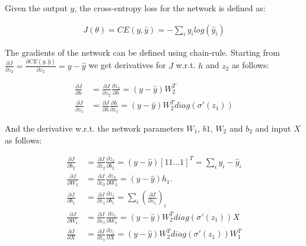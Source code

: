 \documentclass{article}
\begin{document}
Given the output $\hat{y}$, the cross-entropy loss for the network is defined as:

\begin{equation*}
  \label{eq:CE-loss}
  \begin{split}
    J(\theta) = CE(y, \hat{y}) = - \sum_{i} y_{i} log(\hat{y}_{i})
  \end{split}
\end{equation*}

The gradients of the network can be defined using chain-rule. Starting from $\frac{\partial J}{\partial z_{2}} = \frac{\partial CE(y, \hat{y})}{\partial z_{2}} = y - \hat{y}$ we get derivatives for $J$ w.r.t. $h$ and $z_{2}$ as follows:

\begin{equation*}
  \label{eq:temp-grads}
  \begin{split}
    \frac{\partial J}{\partial h} &= \frac{\partial J}{\partial z_{2}}\frac{\partial z_{2}}{\partial h} = (y - \hat{y}) W_{2}^{T}
    \\
    \frac{\partial J}{\partial z_{1}} &= \frac{\partial J}{\partial h}\frac{\partial h}{\partial z_{1}} = (y - \hat{y}) W_{2}^{T} diag(\sigma'(z_{1}))
  \end{split}
\end{equation*}

And the derivative w.r.t. the network parameters $W_{1}$, $b{1}$, $W_{2}$ and $b_{2}$ and input $X$ as follows:

\begin{equation*}
  \label{eq:param-grads}
  \begin{split}
    \frac{\partial J}{\partial b_{2}} &= \frac{\partial J}{\partial z_{2}}\frac{\partial z_{2}}{\partial b_{2}} = (y - \hat{y}) [1 1 \hdots 1]^{T} = \sum_{i}{y_{i} - \hat{y}_{i}}
    \\
    \frac{\partial J}{\partial W_{2}} &= \frac{\partial J}{\partial z_{2}}\frac{\partial z_{2}}{\partial W_{2}} = (y - \hat{y}) h_{1}.
    \\
    \frac{\partial J}{\partial b_{1}} &= \frac{\partial J}{\partial z_{1}}\frac{\partial z_{1}}{\partial b_{1}} = \sum_{i}{(\frac{\partial J}{\partial z_{1}})_{i}}
    \\
    \frac{\partial J}{\partial W_{1}} &= \frac{\partial J}{\partial z_{1}}\frac{\partial z_{1}}{\partial W_{1}} = (y - \hat{y}) W_{2}^{T} diag(\sigma'(z_{1})) X
    \\
    \frac{\partial J}{\partial X} &= \frac{\partial J}{\partial z_{1}}\frac{\partial z_{1}}{\partial X} = (y - \hat{y}) W_{2}^{T} diag(\sigma'(z_{1})) W_{1}^{T}
  \end{split}
\end{equation*}
\end{document}
